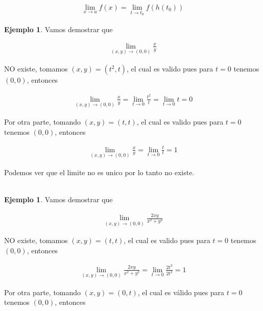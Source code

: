 \documentclass{article}
\theoremstyle{plain}
\theoremstyle{definition}
\newtheorem{ejem}[thm]{Ejemplo}
\begin{document}
\begin{align*}
\displaystyle \lim_{x \to a} f(x) = \lim_{t \to t_0} f(h(t_0))
\end{align*}


\begin{ejem}Vamos demostrar que \\
\end{ejem}


\begin{align*}
\displaystyle \lim_{(x,y) \to (0,0)}  \frac{x}{y}
\end{align*}

NO existe, tomamos $(x,y) = (t^2,t)$, el cual es valido pues para $t=0$ tenemos $(0,0)$, entonces


\begin{align*}
\displaystyle \lim_{(x,y) \to (0,0)}  \frac{x}{y} = \lim_{t \to 0}  \frac{t^2}{t}  = \lim_{t \to 0}  t = 0
\end{align*}


Por otra parte, tomando $(x,y) = (t,t)$, el cual es valido pues para $t=0$ tenemos $(0,0)$, entonces





\begin{align*}
\displaystyle \lim_{(x,y) \to (0,0)}  \frac{x}{y} = \lim_{t \to 0}  \frac{t}{t}  = 1
\end{align*}

Podemos ver que el limite no es unico por lo tanto no existe.  \\ \\



\newpage


\begin{ejem}Vamos demostrar que \\
\end{ejem}


\begin{align*}
\displaystyle \lim_{(x,y) \to (0,0)}  \frac{2xy}{x^2+y^2}
\end{align*}

NO existe, tomamos $(x,y) = (t,t)$, el cual es valido pues para $t=0$ tenemos $(0,0)$, entonces


\begin{align*}
\displaystyle \lim_{(x,y) \to (0,0)}  \frac{2xy}{x^2+y^2} = \lim_{t \to 0}  \frac{2t^2}{2t^2}  = 1
\end{align*}


Por otra parte, tomando $(x,y) = (0,t)$, el cual es v\'alido pues para $t=0$ tenemos $(0,0)$, entonces
\end{document}
